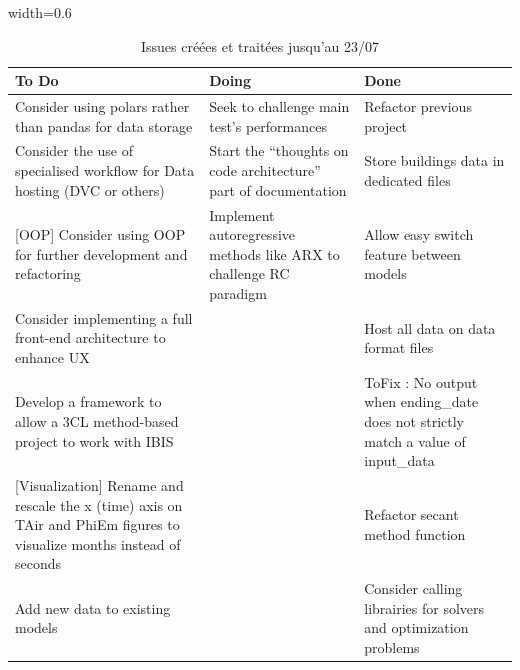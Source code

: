     \begin{table}[H]
        \centering
        \caption{Issues créées et traitées jusqu'au 23/07}
        \begin{adjustbox}{width=0.6\textwidth}
            \begin{tabular}{p{5cm}p{5cm}p{8cm}}
                \toprule
                \textbf{To Do} & \textbf{Doing} & \textbf{Done} \\
                \midrule
                Consider using polars rather than pandas for data storage
                &
                Seek to challenge main test's performances
                &
                Refactor previous project \\

                Consider the use of specialised workflow for Data hosting (DVC or others)
                &
                Start the ``thoughts on code architecture'' part of documentation
                &
                Store buildings data in dedicated files \\

                {[OOP]} Consider using OOP for further development and refactoring
                &
                Implement autoregressive methods like ARX to challenge RC paradigm
                &
                Allow easy switch feature between models \\

                Consider implementing a full front-end architecture to enhance UX
                &
                &
                Host all data on data format files \\

                Develop a framework to allow a 3CL method-based project to work with IBIS
                &
                &
                ToFix : No output when ending\_date does not strictly match a value of input\_data \\

                {[Visualization]} Rename and rescale the x (time) axis on TAir and PhiEm figures to visualize months instead of seconds
                &
                &
                Refactor secant method function \\

                Add new data to existing models
                &
                &
                Consider calling librairies for solvers and optimization problems \\


\end{tabular}
\end{adjustbox}
\end{table}
